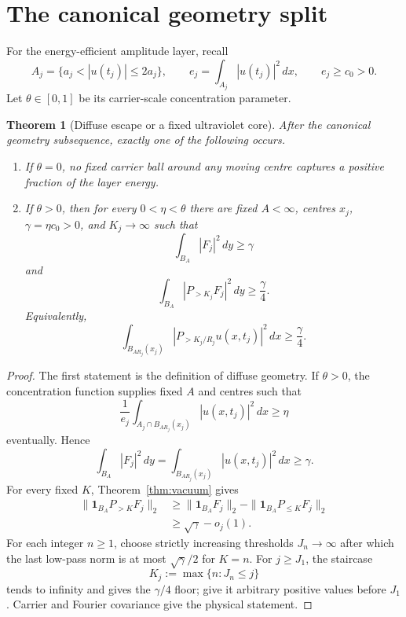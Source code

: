 \documentclass[11pt]{article}
\newtheorem{theorem}{Theorem}
\theoremstyle{remark}
\newcommand{\Plo}[1]{P_{\le #1}}
\newcommand{\PhiHi}[1]{P_{>#1}}
\begin{document}
\section{The canonical geometry split}

For the energy-efficient amplitude layer, recall
\[
 A_j=\{a_j<|u(t_j)|\le2a_j\},
 \qquad
 e_j=\int_{A_j}|u(t_j)|^2\,dx,
 \qquad
 e_j\ge c_0>0.
\]
Let \(\theta\in[0,1]\) be its carrier-scale concentration parameter.

\begin{theorem}[Diffuse escape or a fixed ultraviolet core]
\label{thm:split}
After the canonical geometry subsequence, exactly one of the following
occurs.
\begin{enumerate}
\item If \(\theta=0\), no fixed carrier ball around any moving centre
captures a positive fraction of the layer energy.
\item If \(\theta>0\), then for every \(0<\eta<\theta\) there are fixed
\(A<\infty\), centres \(x_j\), \(\gamma=\eta c_0>0\), and
\(K_j\to\infty\) such that
\[
 \int_{B_A}|F_j|^2\,dy\ge\gamma
\]
and
\[
 \boxed{
 \int_{B_A}|\PhiHi{K_j}F_j|^2\,dy
 \ge\frac{\gamma}{4}.
 }
\]
Equivalently,
\[
 \boxed{
 \int_{B_{AR_j}(x_j)}
 \left|
 \PhiHi{K_j/R_j}u(x,t_j)
 \right|^2\,dx
 \ge\frac{\gamma}{4}.
 }
\]
\end{enumerate}
\end{theorem}

\begin{proof}
The first statement is the definition of diffuse geometry.  If
\(\theta>0\), the concentration function supplies fixed \(A\) and centres
such that
\[
 \frac1{e_j}
 \int_{A_j\cap B_{AR_j}(x_j)}
 |u(x,t_j)|^2\,dx
 \ge\eta
\]
eventually.  Hence
\[
 \int_{B_A}|F_j|^2\,dy
 =
 \int_{B_{AR_j}(x_j)}|u(x,t_j)|^2\,dx
 \ge\gamma.
\]
For every fixed \(K\), Theorem~\ref{thm:vacuum} gives
\[
\begin{aligned}
 \|\mathbf1_{B_A}\PhiHi K F_j\|_2
 &\ge
 \|\mathbf1_{B_A}F_j\|_2
 -
 \|\mathbf1_{B_A}\Plo K F_j\|_2\\
 &\ge\sqrt\gamma-o_j(1).
\end{aligned}
\]
For each integer \(n\ge1\), choose strictly increasing thresholds
\(J_n\to\infty\) after which the last low-pass norm is at most
\(\sqrt\gamma/2\) for \(K=n\).  For \(j\ge J_1\), the staircase
\[
 K_j:=\max\{n:J_n\le j\}
\]
tends to infinity and gives the \(\gamma/4\) floor; give it arbitrary
positive values before \(J_1\).  Carrier and Fourier covariance give the
physical statement.
\end{proof}
\end{document}
